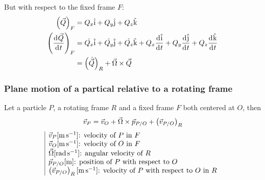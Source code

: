 \documentclass[10pt, twocolumn]{article}
\begin{document}
But with respect to the fixed frame \(F\):
\begin{align*}
  \left( \vec{Q} \right)_{F}                 & = Q_x \hat{\mathrm{i}} + Q_y \hat{\mathrm{j}} + Q_z \hat{\mathrm{k}}                                                                                                       \\
  \left( \frac{\mathrm{d}^{} \vec{Q}}{\mathrm{d}^{} t} \right)_{F} & = \dot{Q_x} \hat{\mathrm{i}} + \dot{Q_y} \hat{\mathrm{j}} + \dot{Q_z} \hat{\mathrm{k}} + Q_x \frac{\mathrm{d}^{} \hat{\mathrm{i}}}{\mathrm{d}^{} t} + Q_y \frac{\mathrm{d}^{} \hat{\mathrm{j}}}{\mathrm{d}^{} t} + Q_z \frac{\mathrm{d}^{} \hat{\mathrm{k}}}{\mathrm{d}^{} t} \\
                                      & = \left( \dot{\vec{Q}} \right)_R + \vec{\Omega} \times \vec{Q}
\end{align*}


\subsubsection{Plane motion of a partical relative to a rotating frame}
Let a particle \(P\), a rotating frame \(R\) and a fixed frame \(F\) both centered at \(O\), then
\[
  \vec{v}_P = \vec{v}_O + \vec{\Omega} \times \vec{p}_{P/O} + \left( \vec{v}_{P/O} \right)_{R}
\]
\[
  \begin{array}{|l}
    \vec{v}_P [\si{\metre\per\second}] \text{: velocity of } P \text{ in } F                                            \\
    \vec{v}_O [\si{\metre\per\second}] \text{: velocity of } O \text{ in } F                                            \\
    \vec{\Omega} [\si{\radian\per\second}] \text{: angular velocity of } R                                              \\
    \vec{p}_{P/O} [\si{\metre}] \text{: position of } P \text{ with respect to } O                                      \\
    \left( \vec{v}_{P/O} \right)_{R} [\si{\metre\per\second}] \text{: velocity of } P \text{ with respect to } O \text{ in } R \\
  \end{array}
\]
\end{document}
